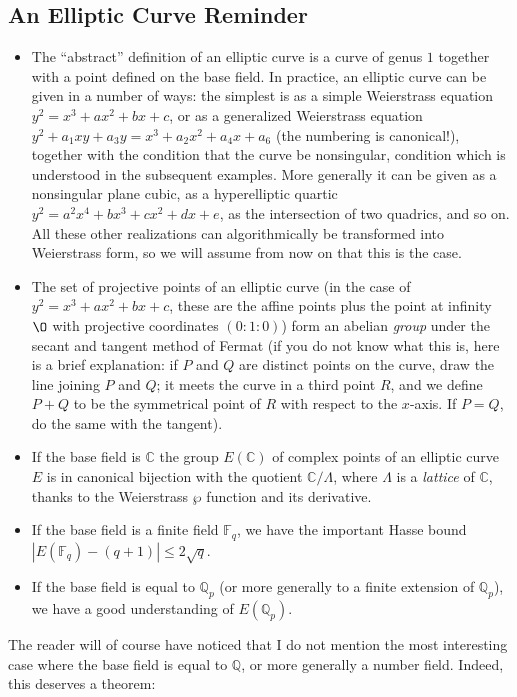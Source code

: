 \documentclass[12pt,a4paper]{article}
\newcommand{\Q}{{\mathbb Q}}
\newcommand{\F}{{\mathbb F}}
\newcommand{\C}{{\mathbb C}}
\begin{document}
\subsection{An Elliptic Curve Reminder}

\begin{itemize}\item The ``abstract'' definition of an elliptic curve is
a curve of genus $1$ together with a point defined on the base field.
In practice, an elliptic curve can be given in a number of ways: the simplest
is as a simple Weierstrass equation $y^2=x^3+ax^2+bx+c$, or as a
generalized Weierstrass equation $y^2+a_1xy+a_3y=x^3+a_2x^2+a_4x+a_6$
(the numbering is canonical!), together with the condition that the curve be
nonsingular, condition which is understood in the subsequent examples. More
generally it can be given as a nonsingular plane cubic, as a hyperelliptic
quartic $y^2=a^2x^4+bx^3+cx^2+dx+e$, as the intersection of two quadrics,
and so on. All these other realizations can algorithmically be transformed
into Weierstrass form, so we will assume from now on that this is the case.
\item The set of projective points of an elliptic curve (in the case of
$y^2=x^3+ax^2+bx+c$, these are the affine points plus the point at infinity
$\O$ with projective coordinates $(0:1:0)$) form an abelian \emph{group}
under the secant and tangent method of Fermat (if you do not know what this
is, here is a brief explanation: if $P$ and $Q$ are distinct points on the
curve, draw the line joining $P$ and $Q$; it meets the curve in a third
point $R$, and we define $P+Q$ to be the symmetrical point of $R$ with
respect to the $x$-axis. If $P=Q$, do the same with the tangent).
\item If the base field is $\C$ the group $E(\C)$ of complex points of an
elliptic curve $E$ is in canonical bijection with the quotient $\C/\Lambda$,
where $\Lambda$ is a \emph{lattice} of $\C$, thanks to the Weierstrass
$\wp$ function and its derivative.
\item If the base field is a finite field $\F_q$, we have the important
Hasse bound $|E(\F_q)-(q+1)|\le 2\sqrt{q}$.
\item If the base field is equal to $\Q_p$ (or more generally to a finite
extension of $\Q_p$), we have a good understanding of $E(\Q_p)$.
\end{itemize}

The reader will of course have noticed that I do not mention the most 
interesting case where the base field is equal to $\Q$, or more generally
a number field. Indeed, this deserves a theorem:
\end{document}
